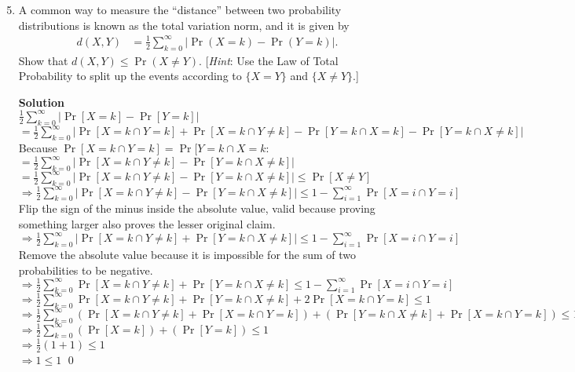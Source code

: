 \documentclass[11pt]{article}
\newenvironment{Parts}{\begin{enumerate}[label=(\alph*)]}{\end{enumerate}}
\newcommand*{\Part}{\item}
\begin{document}
\begin{Parts}
    \setcounter{enumi}{4}
    \Part A common way to measure the ``distance'' between two probability distributions is known as the total variation norm, and it is given by
    \begin{align*}
        d(X, Y) &= \frac{1}{2} \sum_{k=0}^\infty |\Pr(X = k) - \Pr(Y = k)|.
    \end{align*}
    Show that $d(X, Y) \leq \Pr(X \neq Y)$. [\textit{Hint}: Use the Law of Total Probability to split up the events according to $\{X = Y\}$ and $\{X \neq Y\}$.]
\begin{mdframed} \textbf{Solution} \\
$\frac{1}{2}\sum_{k=0}^{\infty}|\Pr[X=k]-\Pr[Y=k]|$ \\
$=\frac{1}{2}\sum_{k=0}^{\infty}|\Pr[X=k \cap Y=k]+\Pr[X=k \cap Y \neq k]-\Pr[Y=k \cap X=k]-\Pr[Y=k \cap X \neq k]|$ \\
Because $\Pr[X=k \cap Y=k]=\Pr[Y=k \cap X=k$: \\
$=\frac{1}{2}\sum_{k=0}^{\infty}|\Pr[X=k \cap Y \neq k]-\Pr[Y=k \cap X \neq k]|$ \\
$=\frac{1}{2}\sum_{k=0}^{\infty}|\Pr[X=k \cap Y \neq k]-\Pr[Y=k \cap X \neq k]| \leq \Pr[X \neq Y]$ \\
$\Rightarrow \frac{1}{2}\sum_{k=0}^{\infty}|\Pr[X=k \cap Y \neq k]-\Pr[Y=k \cap X \neq k]| \leq 1-\sum_{i=1}^{\infty}\Pr[X=i \cap Y=i]$ \\
Flip the sign of the minus inside the absolute value, valid because proving something larger also proves the lesser original claim. \\
$\Rightarrow \frac{1}{2}\sum_{k=0}^{\infty}|\Pr[X=k \cap Y \neq k]+\Pr[Y=k \cap X \neq k]| \leq 1-\sum_{i=1}^{\infty}\Pr[X=i \cap Y=i]$ \\
Remove the absolute value because it is impossible for the sum of two probabilities to be negative. \\
$\Rightarrow \frac{1}{2}\sum_{k=0}^{\infty}\Pr[X=k \cap Y \neq k]+\Pr[Y=k \cap X \neq k] \leq 1-\sum_{i=1}^{\infty}\Pr[X=i \cap Y=i]$ \\
$\Rightarrow \frac{1}{2}\sum_{k=0}^{\infty}\Pr[X=k \cap Y \neq k]+\Pr[Y=k \cap X \neq k]+2\Pr[X=k \cap Y=k] \leq 1$ \\
$\Rightarrow \frac{1}{2}\sum_{k=0}^{\infty}(\Pr[X=k \cap Y \neq k]+\Pr[X=k \cap Y=k])+(\Pr[Y=k \cap X \neq k]+\Pr[X=k \cap Y=k]) \leq 1$ \\
$\Rightarrow \frac{1}{2}\sum_{k=0}^{\infty}(\Pr[X=k])+(\Pr[Y=k]) \leq 1$ \\
$\Rightarrow \frac{1}{2}(1+1) \leq 1$ \\
$\Rightarrow 1 \leq 1$ \qed
\end{mdframed}


\end{Parts}
\end{document}
